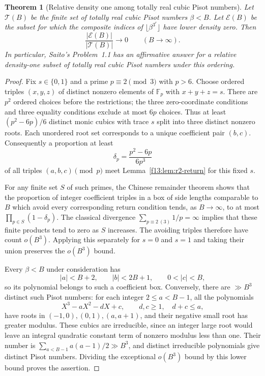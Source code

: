 \documentclass[11pt,a4paper]{article}
\newtheorem{theorem}{Theorem}[section]
\theoremstyle{definition}
\theoremstyle{remark}
\numberwithin{equation}{section}
\begin{document}
\begin{theorem}[Relative density one among totally real cubic Pisot numbers]
\label{f13:thm:r2-density-all}
Let $\mathcal T(B)$ be the finite set of totally real cubic Pisot
numbers $\beta<B$. Let $\mathcal E(B)$ be the subset for which the
composite indices of $\lfloor\beta^{3^r}\rfloor$ have lower density
zero. Then
\[
 \frac{|\mathcal E(B)|}{|\mathcal T(B)|}\longrightarrow0
 \qquad(B\longrightarrow\infty).
\]
In particular, Saito's Problem~1.1 has an affirmative answer for
a relative density-one subset of totally real cubic Pisot numbers
under this ordering.
\end{theorem}
\begin{proof}
Fix $s\in\{0,1\}$ and a prime $p\equiv2\pmod3$ with $p>6$.
Choose ordered triples $(x,y,z)$ of distinct nonzero elements of
$\mathbb F_p$ with $x+y+z=s$. There are $p^2$ ordered choices
before the restrictions; the three zero-coordinate conditions and
three equality conditions exclude at most $6p$ choices. Thus at
least $(p^2-6p)/6$ distinct monic cubics with trace $s$ split into
three distinct nonzero roots. Each unordered root set corresponds
to a unique coefficient pair $(b,c)$. Consequently a proportion at
least
\[
 \delta_p=\frac{p^2-6p}{6p^3}
\]
of all triples $(a,b,c)\pmod p$ meet Lemma~\ref{f13:lem:r2-return}
for this fixed $s$.

For any finite set $S$ of such primes, the Chinese remainder theorem
shows that the proportion of integer coefficient triples in a box
of side lengths comparable to $B$ which avoid every corresponding
return condition tends, as $B\to\infty$, to at most
$\prod_{p\in S}(1-\delta_p)$. The classical divergence
$\sum_{p\equiv2\ (3)}1/p=\infty$ implies that these finite products
tend to zero as $S$ increases. The avoiding triples therefore have
count $o(B^3)$. Applying this separately for $s=0$ and $s=1$ and
taking their union preserves the $o(B^3)$ bound.

Every $\beta<B$ under consideration has
\[
 |a|<B+2,\qquad |b|<2B+1,\qquad 0<|c|<B,
\]
so its polynomial belongs to such a coefficient box. Conversely,
there are $\gg B^3$ distinct such Pisot numbers: for each integer
$2\le a<B-1$, all the polynomials
\[
 X^3-aX^2-dX+c,\qquad d,c\ge1,\quad d+c\le a,
\]
have roots in $(-1,0),(0,1),(a,a+1)$, and their negative small
root has greater modulus. These cubics are irreducible, since an
integer large root would leave an integral quadratic constant term
of nonzero modulus less than one. Their number is
$\sum_{a<B-1}a(a-1)/2\gg B^3$, and distinct irreducible polynomials
give distinct Pisot numbers. Dividing the exceptional $o(B^3)$
bound by this lower bound proves the assertion.
\end{proof}
\end{document}
